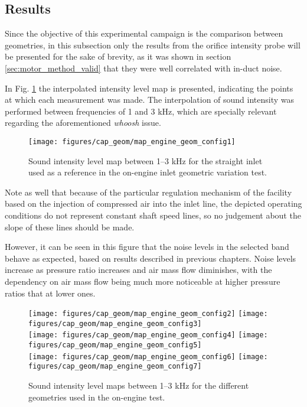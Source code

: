 \subsection{Results}

Since the objective of this experimental campaign is the comparison between geometries, in this subsection only the results from the orifice intensity probe will be presented for the sake of brevity, as it was shown in section \ref{sec:motor_method_valid} that they were well correlated with in-duct noise.

In Fig. \ref{fig:geom_mot_comparison_map1} the interpolated intensity level map is presented, indicating the points at which each measurement was made. The interpolation of sound intensity was performed between frequencies of 1 and 3 kHz, which are specially relevant regarding the aforementioned \emph{whoosh} issue.

\begin{figure}[htb!]
\centering
\texttt{[image: figures/cap\_geom/map\_engine\_geom\_config1]}
\caption{Sound intensity level map between 1--3 kHz for the straight inlet used as a reference in the on-engine inlet geometric variation test.}
\label{fig:geom_mot_comparison_map1}
\end{figure}

Note as well that because of the particular regulation mechanism of the facility based on the injection of compressed air into the inlet line, the depicted operating conditions do not represent constant shaft speed lines, so no judgement about the slope of these lines should be made.

However, it can be seen in this figure that the noise levels in the selected band behave as expected, based on results described in previous chapters. Noise levels increase as pressure ratio increases and air mass flow diminishes, with the dependency on air mass flow being much more noticeable at higher pressure ratios that at lower ones.

\begin{figure}[htb!]
\centering
\texttt{[image: figures/cap\_geom/map\_engine\_geom\_config2]}\hspace{0.05\textwidth}
\texttt{[image: figures/cap\_geom/map\_engine\_geom\_config3]}\\[2mm]
\texttt{[image: figures/cap\_geom/map\_engine\_geom\_config4]}\hspace{0.05\textwidth}
\texttt{[image: figures/cap\_geom/map\_engine\_geom\_config5]}\\[2mm]
\texttt{[image: figures/cap\_geom/map\_engine\_geom\_config6]}\hspace{0.05\textwidth}
\texttt{[image: figures/cap\_geom/map\_engine\_geom\_config7]}
\caption{Sound intensity level maps between 1--3 kHz for the different geometries used in the on-engine test.}
\label{fig:geom_mot_comparison_maps}
\end{figure}

